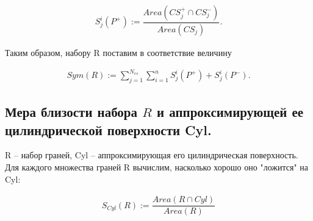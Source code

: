 $$\begin{gathered}
	S_j^i(P^+) := \dfrac{Area(CS_j^+ \cap CS_j^-)}{Area(CS_j)}.
\end{gathered}$$

Таким образом, набору R поставим в соответствие величину

$$\begin{gathered}
	Sym(R):= \sum\limits_{j = 1}^{N_{cs}}\sum\limits_{i = 1}^{n} S_j^i(P^+) + S_j^i(P^-).
\end{gathered}$$

\subsection*{\Large{Мера близости набора $R$ и аппроксимирующей ее цилиндрической поверхности Cyl.}}

R -- набор граней, Cyl -- аппроксимирующая его цилиндрическая поверхность. Для каждого множества граней R вычислим, насколько хорошо оно "ложится" на Cyl:

$$\begin{gathered}
	S_{Cyl}(R) := \dfrac{Area(R \cap Cyl)}{Area(R)}
\end{gathered}$$